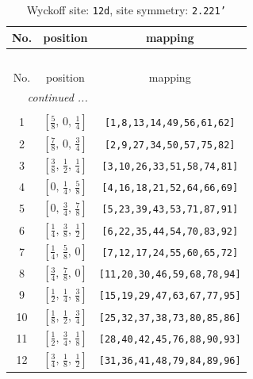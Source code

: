 \documentclass[fleqn,8pt]{jsarticle}
\begin{document}
\begin{longtable}{ccc}
\caption{Wyckoff site: {\tt 12d}, site symmetry: {\tt 2.221'}}
 \\
 \hline \hline
No. & position & mapping \\ \hline \endfirsthead

\multicolumn{2}{l}{\tablename\ \thetable{}} \\
 \hline \hline
No. & position & mapping \\ \hline \endhead

 \hline \hline
\multicolumn{2}{r}{\footnotesize\it continued ...} \\ \endfoot

 \hline \hline
\multicolumn{2}{r}{} \\ \endlastfoot

1 & $\left[ \frac{5}{8},\, 0,\, \frac{1}{4} \right]$ & {\tt [1,8,13,14,49,56,61,62]} \\ \hline
2 & $\left[ \frac{7}{8},\, 0,\, \frac{3}{4} \right]$ & {\tt [2,9,27,34,50,57,75,82]} \\ \hline
3 & $\left[ \frac{3}{8},\, \frac{1}{2},\, \frac{1}{4} \right]$ & {\tt [3,10,26,33,51,58,74,81]} \\ \hline
4 & $\left[ 0,\, \frac{1}{4},\, \frac{5}{8} \right]$ & {\tt [4,16,18,21,52,64,66,69]} \\ \hline
5 & $\left[ 0,\, \frac{3}{4},\, \frac{7}{8} \right]$ & {\tt [5,23,39,43,53,71,87,91]} \\ \hline
6 & $\left[ \frac{1}{4},\, \frac{3}{8},\, \frac{1}{2} \right]$ & {\tt [6,22,35,44,54,70,83,92]} \\ \hline
7 & $\left[ \frac{1}{4},\, \frac{5}{8},\, 0 \right]$ & {\tt [7,12,17,24,55,60,65,72]} \\ \hline
8 & $\left[ \frac{3}{4},\, \frac{7}{8},\, 0 \right]$ & {\tt [11,20,30,46,59,68,78,94]} \\ \hline
9 & $\left[ \frac{1}{2},\, \frac{1}{4},\, \frac{3}{8} \right]$ & {\tt [15,19,29,47,63,67,77,95]} \\ \hline
10 & $\left[ \frac{1}{8},\, \frac{1}{2},\, \frac{3}{4} \right]$ & {\tt [25,32,37,38,73,80,85,86]} \\ \hline
11 & $\left[ \frac{1}{2},\, \frac{3}{4},\, \frac{1}{8} \right]$ & {\tt [28,40,42,45,76,88,90,93]} \\ \hline
12 & $\left[ \frac{3}{4},\, \frac{1}{8},\, \frac{1}{2} \right]$ & {\tt [31,36,41,48,79,84,89,96]} \\
\end{longtable}
\renewcommand{\arraystretch}{1.2}
\end{document}
